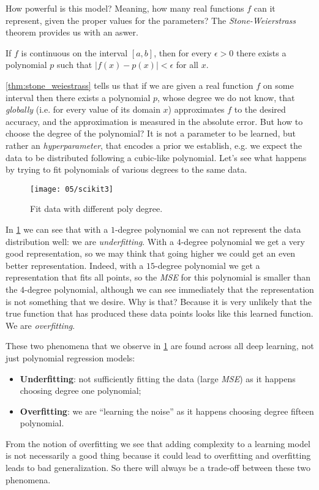 
How powerful is this model? Meaning, how many real functions $f$ can it represent, given the proper values for the parameters? The \emph{Stone-Weierstrass} theorem provides us with an aswer.

\begin{thm}\label{thm:stone_weiestrass}
	If $f$ is continuous on the interval $[a, b]$, then for every $\epsilon > 0$ there exists a polynomial $p$ such that $|f(x) - p(x)| < \epsilon$ for all $x$.
\end{thm}

\cref{thm:stone_weiestrass} tells us that if we are given a real function $f$ on some interval then there exists a polynomial $p$, whose degree we do not know, that \emph{globally} (i.e. for every value of its domain $x$) approximates $f$ to the desired accuracy, and the approximation is measured in the absolute error. But how to choose the degree of the polynomial? It is not a parameter to be learned, but rather an \emph{hyperparameter}, that encodes a prior we establish, e.g. we expect the data to be distributed following a cubic-like polynomial. Let's see what happens by trying to fit polynomials of various degrees to the same data.

 \begin{figure}[H]
 	\centering
	\texttt{[image: 05/scikit3]}
 	\caption{Fit data with different poly degree.}\label{fig:fit_poly}	
\end{figure}

In \cref{fig:fit_poly} we can see that with a $1$-degree polynomial we can not represent the data distribution well: we are \emph{underfitting}. With a $4$-degree polynomial we get a very good representation, so we may think that going higher we could get an even better representation.
Indeed, with a $15$-degree polynomial we get a representation that fits all points, so the \emph{MSE} for this polynomial is smaller than the $4$-degree polynomial, although we can see immediately that the representation is not something that we desire. Why is that? Because it is very unlikely that the true function that has produced these data points looks like this learned function. We are \emph{overfitting}.

These two phenomena that we observe in \cref{fig:fit_poly} are found across all deep learning, not just polynomial regression models:
\begin{itemize}
	\item \textbf{Underfitting}: not sufficiently fitting the data (large \emph{MSE}) as it happens choosing degree one polynomial;
	\item \textbf{Overfitting}: we are ``learning the noise'' as it happens choosing degree fifteen polynomial.
\end{itemize}
From the notion of overfitting we see that adding complexity to a learning model is not necessarily a good thing because it could lead to overfitting and overfitting leads to bad generalization. So there will always be a trade-off between these two phenomena.

